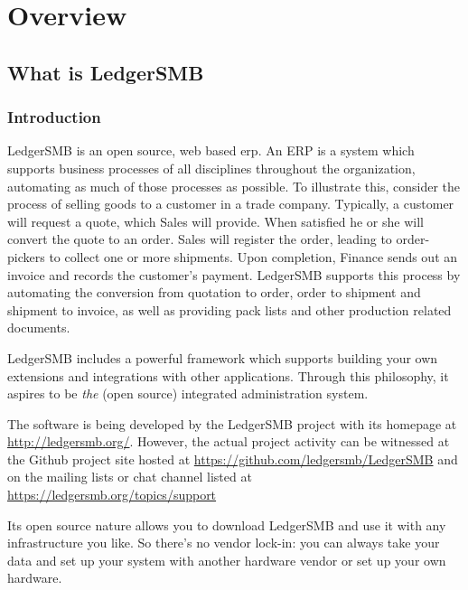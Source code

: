 
\part{Overview}
\label{part-overview}


\chapter{What is LedgerSMB}
\label{cha-what-is-ledgersmb}

\section{Introduction}
\label{sec-ledgersmb-introduction}
LedgerSMB is an open source, web based \gls{erp}. An \gls{ERP} is a system
which supports business processes of all disciplines throughout the
organization, automating as much of those processes as possible. To
illustrate this, consider the process of selling goods to a customer
in a trade company. Typically, a customer will request a quote, which
Sales will provide. When satisfied he or she will convert the quote
to an order. Sales will register the order, leading to order-pickers
to collect one or more shipments. Upon completion, Finance sends
out an invoice and records the customer's payment. LedgerSMB supports
this process by automating the conversion from quotation to order,
order to shipment and shipment to invoice, as well as providing
pack lists and other production related documents.

LedgerSMB includes a
powerful framework which supports building your own extensions and
integrations with other applications. Through this philosophy, it
aspires to be \emph{the} (open source) integrated administration system.

The software is being developed by the LedgerSMB project with its
homepage at \url{http://ledgersmb.org/}.
However, the actual project activity can be witnessed at the Github
project site hosted at \url{https://github.com/ledgersmb/LedgerSMB} and
on the mailing lists or chat channel 
listed at \url{https://ledgersmb.org/topics/support}

Its open source nature allows you to download LedgerSMB and use it with any
infrastructure you like. So there's no vendor lock-in: you can
always take your data and set up your system with another hardware vendor
or set up your own hardware.

